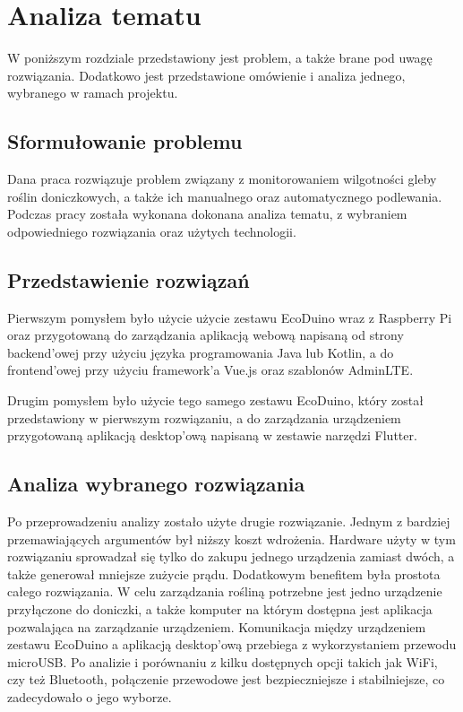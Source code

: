 \documentclass[a4paper,twoside,12pt]{book}
\begin{document}
\chapter{Analiza tematu}

W poniższym rozdziale przedstawiony jest problem, a także brane pod uwagę rozwiązania. Dodatkowo jest przedstawione omówienie i analiza jednego, wybranego w ramach projektu.

\section{Sformułowanie problemu}

Dana praca rozwiązuje problem związany z monitorowaniem wilgotności gleby roślin doniczkowych, a także ich manualnego oraz automatycznego podlewania. Podczas pracy została wykonana dokonana analiza tematu, z wybraniem odpowiedniego rozwiązania oraz użytych technologii.

\section{Przedstawienie rozwiązań}

Pierwszym pomysłem było użycie użycie zestawu EcoDuino wraz z Raspberry Pi oraz przygotowaną do zarządzania aplikacją webową napisaną od strony backend'owej przy użyciu języka programowania Java lub Kotlin, a do frontend'owej przy użyciu framework'a Vue.js oraz szablonów AdminLTE.

Drugim pomysłem było użycie tego samego zestawu EcoDuino, który został przedstawiony w pierwszym rozwiązaniu, a do zarządzania urządzeniem przygotowaną aplikacją desktop'ową napisaną w zestawie narzędzi Flutter.

\section{Analiza wybranego rozwiązania}

Po przeprowadzeniu analizy zostało użyte drugie rozwiązanie. Jednym z bardziej przemawiających argumentów był niższy koszt wdrożenia. Hardware użyty w tym rozwiązaniu sprowadzał się tylko do zakupu jednego urządzenia zamiast dwóch, a także generował mniejsze zużycie prądu. Dodatkowym benefitem była prostota całego rozwiązania. W celu zarządzania rośliną potrzebne jest jedno urządzenie przyłączone do doniczki, a także komputer na którym dostępna jest aplikacja pozwalająca na zarządzanie urządzeniem. Komunikacja między urządzeniem zestawu EcoDuino a aplikacją desktop'ową przebiega z wykorzystaniem przewodu microUSB. Po analizie i porównaniu z kilku dostępnych opcji takich jak WiFi, czy też Bluetooth, połączenie przewodowe jest bezpieczniejsze i stabilniejsze, co zadecydowało o jego wyborze.
\end{document}
